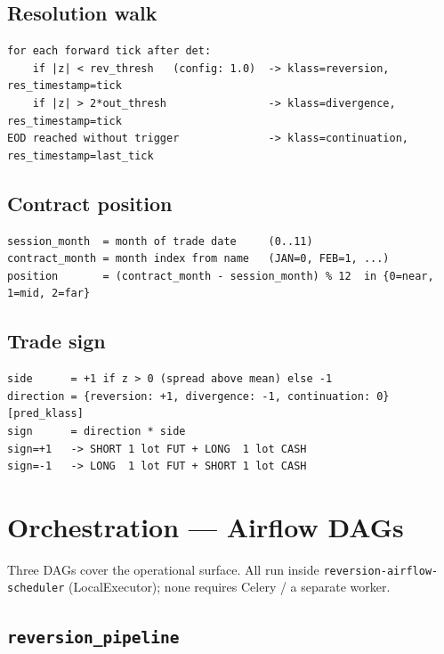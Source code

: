 \documentclass[11pt,a4paper]{article}
\begin{document}
\subsection{Resolution walk}
\begin{lstlisting}[style=bashstyle]
for each forward tick after det:
    if |z| < rev_thresh   (config: 1.0)  -> klass=reversion,    res_timestamp=tick
    if |z| > 2*out_thresh                -> klass=divergence,   res_timestamp=tick
EOD reached without trigger              -> klass=continuation, res_timestamp=last_tick
\end{lstlisting}

\subsection{Contract position}
\begin{lstlisting}[style=bashstyle]
session_month  = month of trade date     (0..11)
contract_month = month index from name   (JAN=0, FEB=1, ...)
position       = (contract_month - session_month) % 12  in {0=near, 1=mid, 2=far}
\end{lstlisting}

\subsection{Trade sign}
\begin{lstlisting}[style=bashstyle]
side      = +1 if z > 0 (spread above mean) else -1
direction = {reversion: +1, divergence: -1, continuation: 0}[pred_klass]
sign      = direction * side
sign=+1   -> SHORT 1 lot FUT + LONG  1 lot CASH
sign=-1   -> LONG  1 lot FUT + SHORT 1 lot CASH
\end{lstlisting}

\section{Orchestration --- Airflow DAGs}

Three DAGs cover the operational surface. All run inside \texttt{reversion-airflow-scheduler} (LocalExecutor); none requires Celery / a separate worker.

\subsection{\texttt{reversion\_pipeline}}
\end{document}
